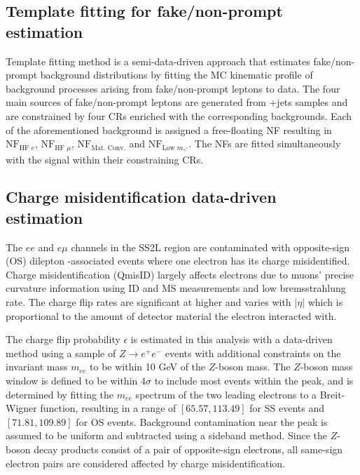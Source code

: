 \documentclass[../thesis.tex]{subfiles}
\begin{document}
\subsection{Template fitting for fake/non-prompt estimation}
\label{sec:template}
Template fitting method is a semi-data-driven approach \citep{bg:ttH_ttW_ML} that estimates fake/non-prompt background distributions by fitting the \acs{MC} kinematic profile of background processes arising from fake/non-prompt leptons to data. The four main sources of fake/non-prompt leptons are generated from \ttbar+jets samples and are constrained by four \acs{CR}s enriched with the corresponding backgrounds. Each of the aforementioned background is assigned a free-floating \acs{NF} resulting in $\mathrm{NF}_{\text{HF }e}$, $\mathrm{NF}_{\text{HF }\mu}$, $\mathrm{NF}_{\text{Mat. Conv.}}$ and $\mathrm{NF}_{\text{Low }m_{\gamma^{*}}}$. The \acs{NF}s are fitted simultaneously with the signal within their constraining \acs{CR}s.

\subsection{Charge misidentification data-driven estimation}
\label{sec:qmisid}
The $ee$ and $e\mu$ channels in the \acs{SS2L} \tttt region are contaminated with opposite-sign (\acs{OS}) dilepton \ttbar-associated events where one electron has its charge misidentified. Charge misidentification (\acs{QmisID}) largely affects electrons due to muons' precise curvature information using \acs{ID} and \acs{MS} measurements and low bremsstrahlung rate. The charge flip rates are significant at higher \pT and varies with $|\eta|$ which is proportional to the amount of detector material the electron interacted with.

The charge flip probability $\epsilon$ is estimated in this analysis with a data-driven method \citep{EXOT-2016-16} using a sample of $Z\rightarrow e^+e^-$ events with additional constraints on the invariant mass $m_{ee}$ to be within 10 GeV of the $Z$-boson mass. The $Z$-boson mass window is defined to be within $4\sigma$ to include most events within the peak, and is determined by fitting the $m_{ee}$ spectrum of the two leading electrons to a Breit-Wigner function, resulting in a range of $[65.57, 113.49]$ for SS events and $[71.81, 109.89]$ for \acs{OS} events. Background contamination near the peak is assumed to be uniform and subtracted using a sideband method. Since the $Z$-boson decay products consist of a pair of opposite-sign electrons, all same-sign electron pairs are considered affected by charge misidentification.
\end{document}
